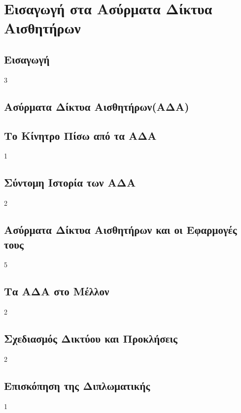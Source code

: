 


\chapter{Εισαγωγή στα Ασύρματα Δίκτυα Αισθητήρων}

\section{Εισαγωγή}
3 %
\section{Ασύρματα Δίκτυα Αισθητήρων(ΑΔΑ)}

\section{Το Κίνητρο Πίσω από τα ΑΔΑ}
1
\section{Σύντομη Ιστορία των ΑΔΑ}
2
\section{Ασύρματα Δίκτυα Αισθητήρων και οι Εφαρμογές τους}
5
\section{Τα ΑΔΑ στο Μέλλον}
2 %
\section{Σχεδιασμός Δικτύου και Προκλήσεις}
2
\section{Επισκόπηση της Διπλωματικής}
1
\label{ch:wsns}